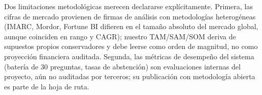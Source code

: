 Dos limitaciones metodológicas merecen declararse explícitamente. Primera, las cifras de mercado provienen de firmas de análisis con metodologías heterogéneas (IMARC, Mordor, Fortune BI difieren en el tamaño absoluto del mercado global, aunque coinciden en rango y CAGR);\cite{imarc2025,mordor2026,fortune2026} nuestro TAM/SAM/SOM deriva de supuestos propios conservadores y debe leerse como orden de magnitud, no como proyección financiera auditada. Segunda, las métricas de desempeño del sistema (batería de 30 preguntas, tasas de abstención) son evaluaciones internas del proyecto, aún no auditadas por terceros; su publicación con metodología abierta es parte de la hoja de ruta.
